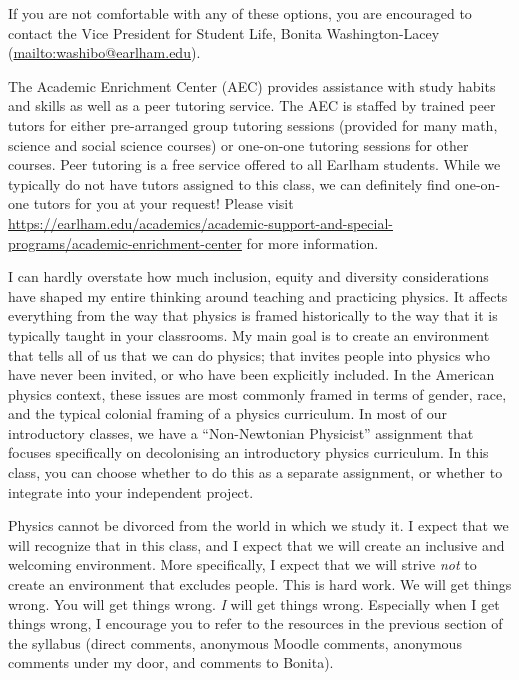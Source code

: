 \documentclass[12pt]{article}
\begin{document}
{\begin{description}
        If you are not comfortable with any of these options, you are
        encouraged to contact the Vice President for Student Life,
        Bonita Washington-Lacey (\url{mailto:washibo@earlham.edu}).

  \item[Academic Enrichment Center (tutoring, study help):] The
        Academic Enrichment Center (AEC) provides assistance with
        study habits and skills as well as a peer tutoring
        service. The AEC is staffed by trained peer tutors for either
        pre-arranged group tutoring sessions (provided for many math,
        science and social science courses) or one-on-one tutoring
        sessions for other courses. Peer tutoring is a free service
        offered to all Earlham students. While we typically do not
        have tutors assigned to this class, we can definitely find
        one-on-one tutors for you at your request! Please visit
        \url{https://earlham.edu/academics/academic-support-and-special-programs/academic-enrichment-center} 
        for more information.

  \item[Diversity Statement:] I can hardly overstate how much inclusion,
        equity and diversity considerations have shaped my entire thinking
        around teaching and practicing physics. It affects everything from the
        way that physics is framed historically to the way that it is
        typically taught in your classrooms. My main goal is to create an
        environment that tells all of us that we can do physics; that invites
        people into physics who have never been invited, or who have been
        explicitly included. In the American physics context, these issues are
        most commonly framed in terms of gender, race, and the typical
        colonial framing of a physics curriculum. In most of our
        introductory classes, we have a ``Non-Newtonian Physicist''
        assignment that focuses specifically on decolonising an
        introductory physics curriculum. In this class, you can choose
        whether to do this as a separate assignment, or whether to
        integrate into your independent project.

        Physics cannot be divorced from the world in which we study it. I
        expect that we will recognize that in this class, and I expect
        that we will create an inclusive and welcoming
        environment. More specifically, I expect that we will strive
        \textit{not} to create an environment that excludes
        people. This is hard work. We will get things wrong. You will
        get things wrong. \textit{I} will get things wrong. Especially
        when I get things wrong, I encourage you to refer to the
        resources in the previous section of the syllabus (direct
        comments, anonymous Moodle comments, anonymous comments under
        my door, and comments to Bonita).  


\end{description}}
\end{document}
